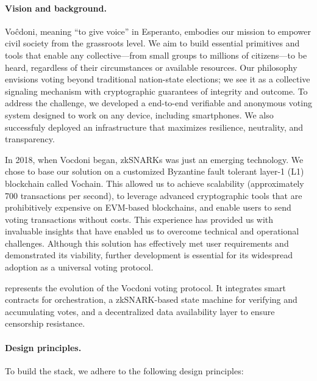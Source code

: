 
\paragraph{Vision and background.}

Voĉdoni, meaning “to give voice” in Esperanto, embodies our mission to empower civil society from the grassroots level. We aim to build essential primitives and tools that enable any collective—from small groups to millions of citizens—to be heard, regardless of their circumstances or available resources. Our philosophy envisions voting beyond traditional nation-state elections; we see it as a collective signaling mechanism with cryptographic guarantees of integrity and outcome. To address the challenge, we developed a end-to-end verifiable and anonymous voting system designed to work on any device, including smartphones. We also successfuly deployed an infrastructure that maximizes resilience, neutrality, and transparency.

In 2018, when Vocdoni began, zkSNARKs was just an emerging technology. We chose to base our solution on a customized Byzantine fault tolerant layer-1 (L1) blockchain called Vochain. This allowed us to achieve scalability (approximately 700 transactions per second), to leverage advanced cryptographic tools that are prohibitively expensive on EVM-based blockchains, and enable users to send voting transactions without costs. This experience has provided us with invaluable insights that have enabled us to overcome technical and operational challenges. Although this solution has effectively met user requirements and demonstrated its viability, further development is essential for its widespread adoption as a universal voting protocol.

\Davinci represents the evolution of the Vocdoni voting protocol. It integrates smart contracts for orchestration, a zkSNARK-based state machine for verifying and accumulating votes, and a decentralized data availability layer to ensure censorship resistance.

\paragraph{Design principles.}

To build the \davinci stack, we adhere to the following design principles:


